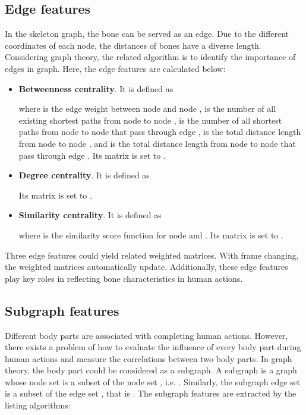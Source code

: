 \documentclass[journal]{IEEEtran}
\begin{document}
\subsection{Edge features}

In the skeleton graph, the bone can be served as an edge. Due to the different coordinates of each node, the distances of bones have a diverse length. Considering graph theory, the related algorithm is to identify the importance of edges in graph. Here, the edge features are calculated below:

\begin{itemize}

    \item \textbf{Betweenness centrality}. It is defined as
        
        where  is the edge weight between node  and node ,  is the number of all existing shortest paths from node  to node ,  is the number of all shortest paths from node  to node  that pass through edge ,  is the total distance length from node  to node , and  is the total distance length from node  to node  that pass through edge . Its matrix is set to .
    \item \textbf{Degree centrality}. It is defined as
        
        Its matrix is set to .
    \item \textbf{Similarity centrality}. It is defined as
        
    where  is the similarity score function for node  and . Its matrix is set to .
\end{itemize}

Three edge features could yield related weighted matrices. With frame changing, the weighted matrices automatically update. Additionally, these edge features play key roles in reflecting bone characteristics in human actions.

\subsection{Subgraph features}

Different body parts are associated with completing human actions. However, there exists a problem of how to evaluate the influence of every body part during human actions and measure the correlations between two body parts. In graph theory, the body part could be considered as a subgraph. A subgraph  is a graph whose node set  is a subset of the node set , i.e. . Similarly, the subgraph edge set  is a subset of the edge set , that is . The subgraph features are extracted by the listing algorithms:
\end{document}

